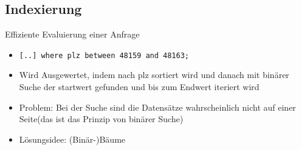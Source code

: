\documentclass{article}
\begin{document}
\subsection*{Indexierung}

\begin{block}{Effiziente Evaluierung einer Anfrage}
  \begin{itemize}
    \item \texttt{[..] where plz between 48159 and 48163;}
    \item Wird Ausgewertet, indem nach plz sortiert wird und danach mit binärer Suche der startwert gefunden und bis zum Endwert iteriert wird
    \item Problem: Bei der Suche sind die Datensätze wahrscheinlich nicht auf einer Seite(das ist das Prinzip von binärer Suche)
    \item Lösungsidee: (Binär-)Bäume
  \end{itemize}
\end{block}
\end{document}
